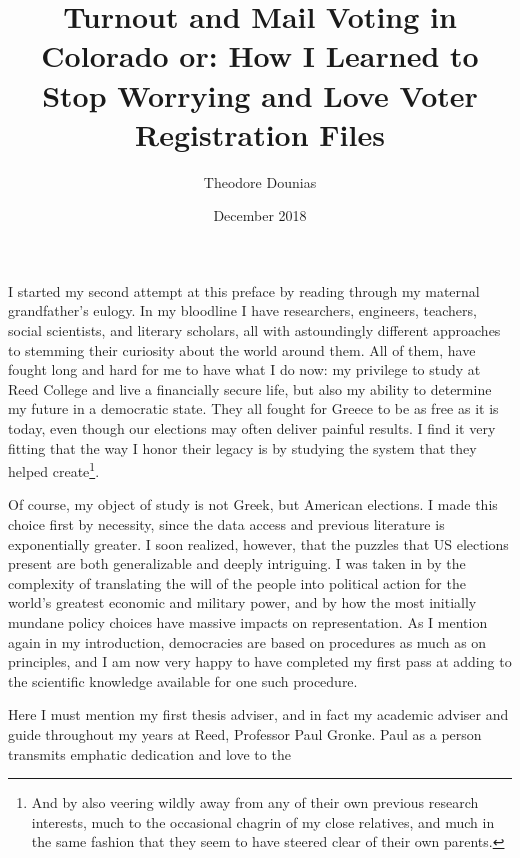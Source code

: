 \documentclass[12pt,twoside]{reedthesis}
\title{Turnout and Mail Voting in Colorado or: How I Learned to Stop Worrying
and Love Voter Registration Files}
\author{Theodore Dounias}
\date{December 2018}
\begin{document}
      \maketitle
  
  \frontmatter %
  \pagestyle{empty} %

  
      \begin{preface}
      I started my second attempt at this preface by reading through my
      maternal grandfather's eulogy. In my bloodline I have researchers,
      engineers, teachers, social scientists, and literary scholars, all with
      astoundingly different approaches to stemming their curiosity about the
      world around them. All of them, have fought long and hard for me to have
      what I do now: my privilege to study at Reed College and live a
      financially secure life, but also my ability to determine my future in a
      democratic state. They all fought for Greece to be as free as it is
      today, even though our elections may often deliver painful results. I
      find it very fitting that the way I honor their legacy is by studying
      the system that they helped create\footnote{And by also veering wildly
        away from any of their own previous research interests, much to the
        occasional chagrin of my close relatives, and much in the same fashion
        that they seem to have steered clear of their own parents.}. \par Of
      course, my object of study is not Greek, but American elections. I made
      this choice first by necessity, since the data access and previous
      literature is exponentially greater. I soon realized, however, that the
      puzzles that US elections present are both generalizable and deeply
      intriguing. I was taken in by the complexity of translating the will of
      the people into political action for the world's greatest economic and
      military power, and by how the most initially mundane policy choices
      have massive impacts on representation. As I mention again in my
      introduction, democracies are based on procedures as much as on
      principles, and I am now very happy to have completed my first pass at
      adding to the scientific knowledge available for one such procedure.
      \par Here I must mention my first thesis adviser, and in fact my
      academic adviser and guide throughout my years at Reed, Professor Paul
      Gronke. Paul as a person transmits emphatic dedication and love to the

\end{preface}
\end{document}
